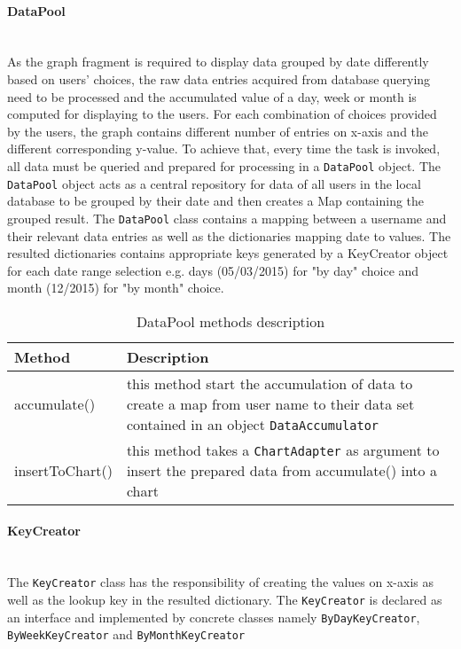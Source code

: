 \paragraph{DataPool}\mbox{} \\
As the graph fragment is required to display data grouped by date differently based on users' choices, the raw data
entries acquired from database querying need to be processed and the accumulated value of a day, week or month is
computed for displaying to the users. For each combination of choices provided by the users, the graph contains
different number of entries on x-axis and the different corresponding y-value. To achieve that, every time the task is
invoked, all data must be queried and prepared for processing in a \texttt{DataPool} object. The \texttt{DataPool}
object acts as a central repository for data of all users in the local database to be grouped by their date and then
creates a Map containing the grouped result. The \texttt{DataPool} class contains a mapping between a username and their
relevant data entries as well as the dictionaries mapping date to values. The resulted dictionaries contains appropriate
keys generated by a KeyCreator object for each date range selection e.g. days (05/03/2015) for "by day" choice and month
(12/2015) for "by month" choice.

\begin{table}
\begin{center}
    \begin{tabularx}{\textwidth}{| l | X |}
        \hline Method & Description \\
        \hline accumulate() & 
            this method start the accumulation of data to create a map from user name to their data set contained in an
            object \texttt{DataAccumulator} \\
        \hline insertToChart() &
            this method takes a \texttt{ChartAdapter} as argument to insert the prepared data from accumulate() into a
            chart \\
        \hline
    \end{tabularx}
\end{center}
\caption{DataPool methods description}
\end{table}

\paragraph{KeyCreator}\mbox{} \\
The \texttt{KeyCreator} class has the responsibility of creating the values on x-axis as well as the lookup key in the
resulted dictionary. The \texttt{KeyCreator} is declared as an interface and implemented by concrete classes namely
\texttt{ByDayKeyCreator}, \texttt{ByWeekKeyCreator} and \texttt{ByMonthKeyCreator}

